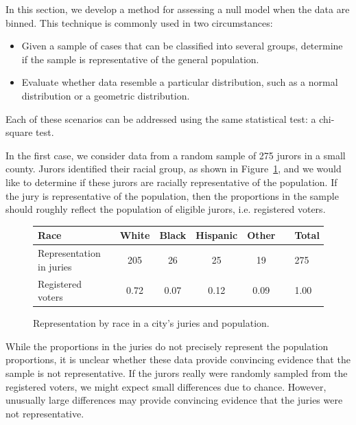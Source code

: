 In this section, we develop a method for assessing a null model when the data are binned.
This technique is commonly used in two circumstances:
\begin{itemize}
\setlength{\itemsep}{0mm}
\item Given a sample of cases that can be classified into several groups, determine if the sample is representative of the general population.
\item Evaluate whether data resemble a particular distribution, such as a normal distribution or a geometric distribution.
\end{itemize}
Each of these scenarios can be addressed using the same statistical test: a chi-square test.


In the first case, we consider data from a random sample of 275 jurors in a small county. Jurors identified their racial group, as shown in Figure~\ref{juryRepresentationAndCityRepresentationForRace}, and we would like to determine if these jurors are racially representative of the population.  If the jury is representative of the population, then the proportions in the sample should roughly reflect the population of eligible jurors, i.e. registered voters.

\begin{figure}[h]
\centering
\begin{tabular}{ll ccc c ll}
\hline
Race	 & \hspace{2mm} & White & Black & Hispanic & Other & \hspace{2mm} & Total \\
\hline
Representation in juries &	& 205 & 26 & 25 & 19 & & 275 \\
Registered voters	 & 		& 0.72 & 0.07 & 0.12 & 0.09 & & 1.00 \\
\hline
\end{tabular}
\caption{Representation by race in a city's juries and population.}
\label{juryRepresentationAndCityRepresentationForRace}
\end{figure}

While the proportions in the juries do not precisely represent the population proportions, it is unclear whether these data provide convincing evidence that the sample is not representative. If the jurors really were randomly sampled from the registered voters, we might expect small differences due to chance. However, unusually large differences may provide convincing evidence that the juries were not representative.

